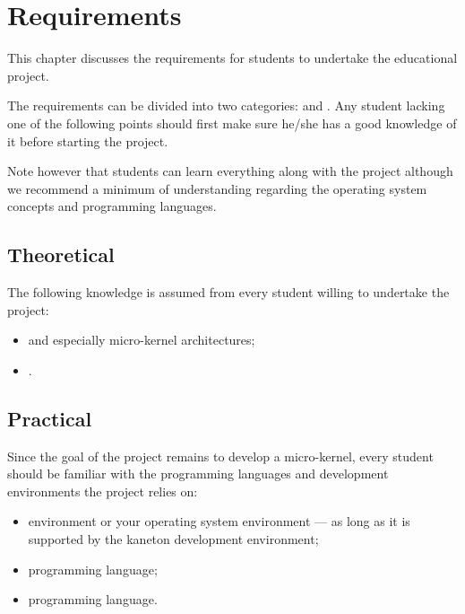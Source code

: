 %
%
%
%
%
%

%
%

\chapter{Requirements}
\label{chapter:requirements}

This chapter discusses the requirements for students to undertake the
 educational project.

\newpage

%
%

The requirements can be divided into two categories:  and
. Any student lacking one of the following points should
first make sure he/she has a good knowledge of it before starting the
project.

Note however that students can learn everything along with the project
although we recommend a minimum of understanding regarding the operating
system concepts and programming languages.

%
%

\section{Theoretical}

The following knowledge is assumed from every student willing to
undertake the project:

\begin{itemize}
  \item
     and especially micro-kernel
    architectures;
  \item
    .
\end{itemize}

%
%

\section{Practical}

Since the goal of the project remains to develop a micro-kernel, every
student should be familiar with the programming languages and
development environments the project relies on:

\begin{itemize}
  \item
     environment or your operating system environment --- as
    long as it is supported by the kaneton development environment;
  \item
     programming language;
  \item
     programming language.
\end{itemize}
